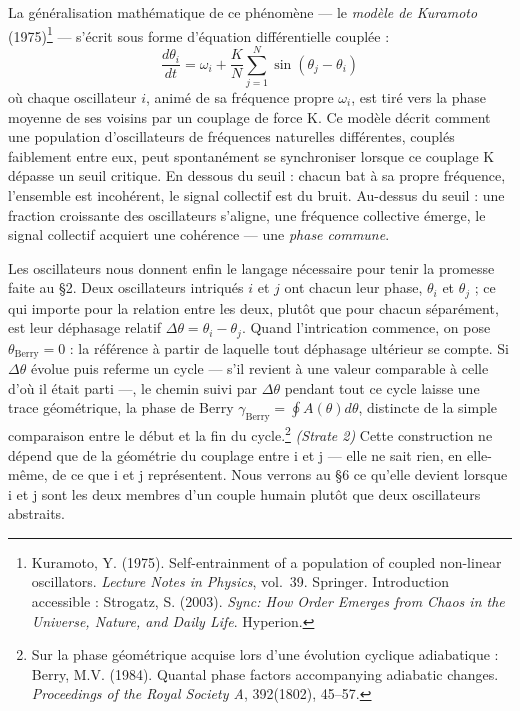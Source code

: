 \documentclass[french, 11pt, twoside, openright, a5paper]{book}
\begin{document}
La généralisation mathématique de ce phénomène --- le \emph{modèle de
Kuramoto} (1975)\footnote{Kuramoto, Y. (1975). Self-entrainment of a population of coupled non-linear oscillators. \emph{Lecture Notes in Physics}, vol.~39. Springer. Introduction accessible : Strogatz, S. (2003). \emph{Sync: How Order Emerges from Chaos in the Universe, Nature, and Daily Life}. Hyperion.} --- s'écrit sous forme d'équation différentielle couplée :
\[ \frac{d\theta_i}{dt} = \omega_i + \frac{K}{N} \sum_{j=1}^N \sin(\theta_j - \theta_i) \]
où chaque oscillateur $i$, animé de sa fréquence propre $\omega_i$, est tiré vers la phase
moyenne de ses voisins par un couplage de force K. Ce modèle décrit
comment une population d'oscillateurs de fréquences naturelles
différentes, couplés faiblement entre eux, peut spontanément se
synchroniser lorsque ce couplage K dépasse un seuil critique. En dessous
du seuil : chacun bat à sa propre fréquence, l'ensemble est incohérent,
le signal collectif est du bruit. Au-dessus du seuil : une fraction
croissante des oscillateurs s'aligne, une fréquence collective émerge,
le signal collectif acquiert une cohérence --- une \emph{phase commune}.

Les oscillateurs nous donnent enfin le langage nécessaire pour tenir la
promesse faite au §2. Deux oscillateurs intriqués $i$ et $j$ ont chacun leur
phase, $\theta_i$ et $\theta_j$ ; ce qui importe pour la relation entre les deux, plutôt
que pour chacun séparément, est leur déphasage relatif $\Delta\theta = \theta_i - \theta_j$.
Quand l'intrication commence, on pose $\theta_{\text{Berry}} = 0$ : la référence à
partir de laquelle tout déphasage ultérieur se compte. Si $\Delta\theta$ évolue puis
referme un cycle --- s'il revient à une valeur comparable à celle d'où
il était parti ---, le chemin suivi par $\Delta\theta$ pendant tout ce cycle laisse
une trace géométrique, la phase de Berry $\gamma_{\text{Berry}} = \oint A(\theta) d\theta$, distincte
de la simple comparaison entre le début et la fin du cycle.\footnote{Sur la phase géométrique acquise lors d'une évolution cyclique adiabatique : Berry, M.V. (1984). Quantal phase factors accompanying adiabatic changes. \emph{Proceedings of the Royal Society A}, 392(1802), 45--57.}
\emph{(Strate 2)} Cette construction ne dépend que de la géométrie du
couplage entre i et j --- elle ne sait rien, en elle-même, de ce que i
et j représentent. Nous verrons au §6 ce qu'elle devient lorsque i et j
sont les deux membres d'un couple humain plutôt que deux oscillateurs
abstraits.
\end{document}
